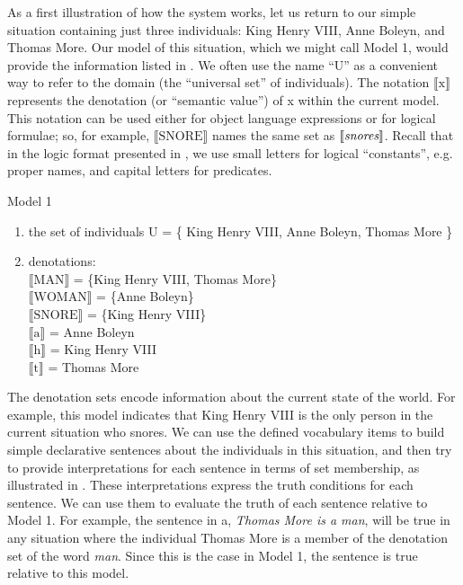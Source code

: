 As a first illustration of how the system works, let us return to our simple situation containing just three individuals: King Henry VIII, Anne Boleyn, and Thomas More. Our model of this situation, which we might call Model 1, would provide the information listed in . We often use the name “U” as a convenient way to refer to the domain (the “universal set” of individuals). The notation $\llbracket\text{x}\rrbracket$  represents the denotation (or “semantic value”) of x within the current model. This notation can be used either for object language expressions or for logical formulae; so, for example, $\llbracket\text{SNORE}\rrbracket$  names the same set as $\llbracket\text{\itshape snores}\rrbracket$. Recall that in the logic format presented in , we use small letters for logical “constants”, e.g. proper names, and capital letters for predicates.

\newpage 
\ea \label{ex:13.20}Model 1\\
\begin{enumerate}[label=\roman*.]
\item the set of individuals U = \{ King Henry VIII, Anne Boleyn, Thomas More \}
\item denotations:\\
$\llbracket\text{MAN}\rrbracket$  = \{King Henry VIII, Thomas More\}\\
$\llbracket\text{WOMAN}\rrbracket$  = \{Anne Boleyn\}\\
$\llbracket\text{SNORE}\rrbracket$  = \{King Henry VIII\}\\
$\llbracket\text{a}\rrbracket$  = Anne Boleyn\\
$\llbracket\text{h}\rrbracket$  = King Henry VIII\\
$\llbracket\text{t}\rrbracket$  = Thomas More
\end{enumerate}
\z

The denotation sets encode information about the current state of the world. For example, this model indicates that King Henry VIII is the only person in the current situation who snores. We can use the defined vocabulary items to build simple declarative sentences about the individuals in this situation, and then try to provide interpretations for each sentence in terms of set membership, as illustrated in . These interpretations express the truth conditions for each sentence. We can use them to evaluate the truth of each sentence relative to Model 1. For example, the sentence in a, \textit{Thomas More is a man}, will be true in any situation where the individual Thomas More is a member of the denotation set of the word \textit{man}. Since this is the case in Model 1, the sentence is true relative to this model.



